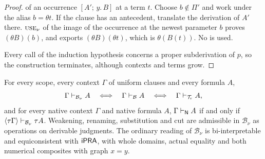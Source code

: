 \begin{proof}
\emph{} of an occurrence $[A';\,y.\,B]$ at a term $t$. Choose
$b\notin\Pi'$ and work under the alias $b=\theta t$. If the clause has an
antecedent, translate the derivation of $A'$ there.
$\rulename{Use}_{\nu}$ of the image of the occurrence at the newest
parameter $b$ proves $(\theta B)(b)$, and  exports
$(\theta B)(\theta t)$, which is $\theta(B(t))$. No  is
used.

Every call of the induction hypothesis concerns a proper subderivation of
$p$, so the construction terminates, although contexts and terms grow.
\end{proof}

\begin{corollary}
\label{disch:cor:alias-newest}
For every scope, every context $\Gamma$ of uniform clauses and every
formula $A$,
\[
 \Gamma\vdash_{\mathcal B_{\nu}}A
 \quad\Longleftrightarrow\quad
 \Gamma\vdash_{\mathcal B}A
 \quad\Longleftrightarrow\quad
 \Gamma\vdash_{\mathcal T_{\mathrm r}}A ,
\]
and for every native context $\Gamma$ and native formula $A$,
$\Gamma\vdash_{\mathsf{N}}A$ if and only if
$\langle\tau\Gamma\rangle\vdash_{\mathcal B_{\nu}}\tau A$. Weakening,
renaming, substitution and cut are admissible in $\mathcal B_{\nu}$ as
operations on derivable judgments. The ordinary reading of
$\mathcal B_{\nu}$ is bi-interpretable and equiconsistent with $\mathsf{iPRA}$,
with whole domains, actual equality and both numerical composites with
graph $x=y$.
\end{corollary}

